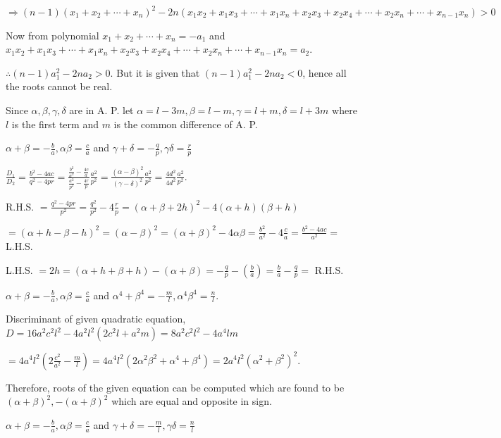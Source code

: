   $\Rightarrow (n - 1)(x_1 + x_2 + \cdots + x_n)^2 - 2n(x_1x_2 + x_1x_3 + \cdots + x_1x_n + x_2x_3 +
  x_2x_4 + \cdots + x_2x_n + \cdots + x_{n - 1}x_n) > 0$

  Now from polynomial $x_1 + x_2 + \cdots + x_n = -a_1$ and $x_1x_2 + x_1x_3 + \cdots + x_1x_n + x_2x_3 +
  x_2x_4 + \cdots + x_2x_n + \cdots + x_{n - 1}x_n = a_2$.

  $\therefore (n - 1)a_1^2 - 2na_2 > 0$. But it is given that $(n - 1)a_1^2 - 2na_2 < 0$, hence all the
  roots cannot be real.
\item Since $\alpha, \beta, \gamma, \delta$ are in A. P. let $\alpha = l - 3m, \beta = l - m, \gamma = l +
  m, \delta = l + 3m$ where $l$ is the first term and $m$ is the common difference of A. P.

  $\alpha + \beta = -\frac{b}{a}, \alpha\beta = \frac{c}{a}$ and $\gamma + \delta = -\frac{q}{p},
  \gamma\delta = \frac{r}{p}$

  $\frac{D_1}{D_2} = \frac{b^2 - 4ac}{q^2 - 4pr} = \frac{\frac{b^2}{a^2} - \frac{4c}{a}}{\frac{a^2}{p^2} -
    \frac{4r}{p}}\frac{a^2}{p^2}= \frac{(\alpha - \beta)^2}{(\gamma - \delta)^2}\frac{a^2}{p^2} =
  \frac{4d^2}{4d^2}\frac{a^2}{p^2}$.
\item R.H.S. $= \frac{q^2 - 4pr}{p^2} = \frac{q^2}{p^2} - 4\frac{r}{p} = (\alpha + \beta + 2h)^2 - 4(\alpha
  + h)(\beta + h)$

  $= (\alpha + h - \beta - h)^2 = (\alpha - \beta)^2 = (\alpha + \beta)^2 - 4\alpha\beta = \frac{b^2}{a^2} -
  4\frac{c}{a} = \frac{b^2 - 4ac}{a^2} =$ L.H.S.
\item L.H.S. $= 2h = (\alpha + h + \beta + h) - (\alpha + \beta) = -\frac{q}{p} -(\frac{b}{a}) = \frac{b}{a}
  - \frac{q}{p} =$ R.H.S.
\item $\alpha + \beta = -\frac{b}{a}, \alpha\beta = \frac{c}{a}$ and $\alpha^4 + \beta^4 = -\frac{m}{l},
  \alpha^4\beta^4 = \frac{n}{l}$.

  Discriminant of given quadratic equation, $D = 16a^2c^2l^2 - 4a^2l^2(2c^2l + a^2m) = 8a^2c^2l^2 - 4a^4lm$

  $= 4a^4l^2\left(2\frac{c^2}{a^2} - \frac{m}{l}\right)= 4a^4l^2(2\alpha^2\beta^2 + \alpha^4 + \beta^4) =
  2a^4l^2(\alpha^2 + \beta^2)^2$.

  Therefore, roots of the given equation can be computed which are found to be $(\alpha + \beta)^2, -(\alpha
  + \beta)^2$ which are equal and opposite in sign.
\item $\alpha + \beta = -\frac{b}{a}, \alpha\beta = \frac{c}{a}$ and $\gamma + \delta = -\frac{m}{l},
  \gamma\delta = \frac{n}{l}$

